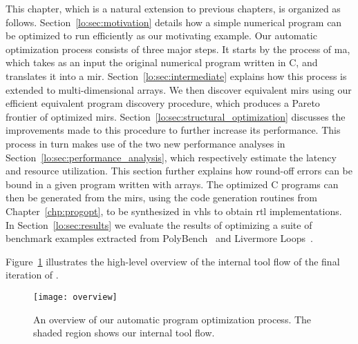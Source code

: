 This chapter, which is a natural extension to previous chapters, is
organized as follows.  Section~\ref{lo:sec:motivation} details how a
simple numerical program can be optimized to run efficiently as our
motivating example.  Our automatic optimization process consists of
three major steps.  It starts by the process of \acrlong{ma}, which
takes as an input the original numerical program written in C, and
translates it into a \gls{mir}.  Section~\ref{lo:sec:intermediate}
explains how this process is extended to multi-dimensional arrays.  We
then discover equivalent \glspl{mir} using our efficient equivalent
program discovery procedure, which produces a Pareto frontier of optimized
\glspl{mir}.  Section~\ref{lo:sec:structural_optimization} discusses the
improvements made to this procedure to further increase its performance.
This process in turn makes use of the two new performance analyses in
Section~\ref{lo:sec:performance_analysis}, which respectively estimate the
latency and resource utilization.  This section further explains how round-off
errors can be bound in a given program written with arrays.  The optimized C
programs can then be generated from the \glspl{mir}, using the code generation
routines from Chapter~\ref{chp:progopt}, to be synthesized in \gls{vhls} to
obtain \gls{rtl} implementations.  In Section~\ref{lo:sec:results} we evaluate
the results of optimizing a suite of benchmark examples extracted from
PolyBench~\cite{polybench} and Livermore Loops~\cite{livermore}.

Figure~\ref{lo:fig:overview} illustrates the high-level overview of the
internal tool flow of the final iteration of \soap.
\begin{figure}[ht]
    \centering
    \texttt{[image: overview]}
    \caption{%
        An overview of our automatic program optimization process. The shaded
        region shows our internal tool flow.
    }\label{lo:fig:overview}
\end{figure}
